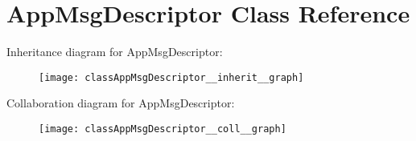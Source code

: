 \hypertarget{classAppMsgDescriptor}{}\section{App\+Msg\+Descriptor Class Reference}
\label{classAppMsgDescriptor}


Inheritance diagram for App\+Msg\+Descriptor\+:\nopagebreak
\begin{figure}[H]
\begin{center}
\leavevmode
\texttt{[image: classAppMsgDescriptor\_\_inherit\_\_graph]}
\end{center}
\end{figure}


Collaboration diagram for App\+Msg\+Descriptor\+:\nopagebreak
\begin{figure}[H]
\begin{center}
\leavevmode
\texttt{[image: classAppMsgDescriptor\_\_coll\_\_graph]}
\end{center}
\end{figure}
